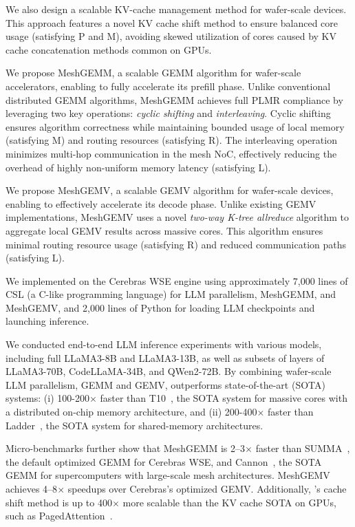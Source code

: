 We also design a scalable KV-cache management method for wafer-scale devices. This approach features a novel KV cache shift method to ensure balanced core usage (satisfying P and M), avoiding skewed utilization of cores caused by KV cache concatenation methods common on GPUs.

We propose MeshGEMM, a scalable GEMM algorithm for wafer-scale accelerators, enabling \sys to fully accelerate its prefill phase. Unlike conventional distributed GEMM algorithms, MeshGEMM achieves full PLMR compliance by leveraging two key operations: \emph{cyclic shifting} and \emph{interleaving}. Cyclic shifting ensures algorithm correctness while maintaining bounded usage of local memory (satisfying M) and routing resources (satisfying R). The interleaving operation minimizes multi-hop communication in the mesh NoC, effectively reducing the overhead of highly non-uniform memory latency (satisfying L).

We propose MeshGEMV, a scalable GEMV algorithm for wafer-scale devices, enabling \sys to effectively accelerate its decode phase. Unlike existing GEMV implementations, MeshGEMV uses a novel \emph{two-way K-tree allreduce} algorithm to aggregate local GEMV results across massive cores. This algorithm ensures minimal routing resource usage (satisfying R) and reduced communication paths (satisfying L).

\vspace{0.2cm}
\noindent
We implemented \sys on the Cerebras WSE engine using approximately 7,000 lines of CSL (a C-like programming language) for LLM parallelism, MeshGEMM, and MeshGEMV, and 2,000 lines of Python for loading LLM checkpoints and launching inference.

We conducted end-to-end LLM inference experiments with various models, including full LLaMA3-8B and LLaMA3-13B, as well as subsets of layers of LLaMA3-70B, CodeLLaMA-34B, and QWen2-72B. By combining wafer-scale LLM parallelism, GEMM and GEMV, \sys outperforms state-of-the-art (SOTA) systems:
(i) 100-200$\times$ faster than T10~\cite{t10}, the SOTA system for massive cores with a distributed on-chip memory architecture, and
(ii) 200-400$\times$ faster than Ladder~\cite{ladder}, the SOTA system for shared-memory architectures.

Micro-benchmarks further show that MeshGEMM is 2–3$\times$ faster than SUMMA~\cite{summa}, the default optimized GEMM for Cerebras WSE, and Cannon~\cite{cannon}, the SOTA GEMM for supercomputers with large-scale mesh architectures. MeshGEMV achieves 4–8$\times$ speedups over Cerebras’s optimized GEMV. Additionally, \sys’s cache shift method is up to 400$\times$ more scalable than the KV cache SOTA on GPUs, such as PagedAttention~\cite{vllm}.

